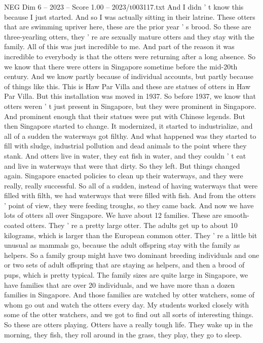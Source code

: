 \begin{textsample}{NEG Dim 6 – 2023 – Score 1.00 – 2023/t003117.txt}
And I didn ' t know this because I just started.
And so I was actually sitting in their latrine.
These otters that are swimming upriver here, these are the prior year ' s brood.
So these are three-yearling otters, they ' re are sexually mature otters and they stay with the family.
All of this was just incredible to me.
And part of the reason it was incredible to everybody is that the otters were returning after a long absence.
So we know that there were otters in Singapore sometime before the mid-20th century.
And we know partly because of individual accounts, but partly because of things like this.
This is Haw Par Villa and these are statues of otters in Haw Par Villa.
But this installation was moved in 1937.
So before 1937, we know that otters weren ' t just present in Singapore, but they were prominent in Singapore.
And prominent enough that their statues were put with Chinese legends.
But then Singapore started to change.
It modernized, it started to industrialize, and all of a sudden the waterways got filthy.
And what happened was they started to fill with sludge, industrial pollution and dead animals to the point where they stank.
And otters live in water, they eat fish in water, and they couldn ' t eat and live in waterways that were that dirty.
So they left.
But things changed again.
Singapore enacted policies to clean up their waterways, and they were really, really successful.
So all of a sudden, instead of having waterways that were filled with filth, we had waterways that were filled with fish.
And from the otters ' point of view, they were feeding troughs, so they came back.
And now we have lots of otters all over Singapore.
We have about 12 families.
These are smooth-coated otters.
They ' re a pretty large otter.
The adults get up to about 10 kilograms, which is larger than the European common otter.
They ' re a little bit unusual as mammals go, because the adult offspring stay with the family as helpers.
So a family group might have two dominant breeding individuals and one or two sets of adult offspring that are staying as helpers, and then a brood of pups, which is pretty typical.
The family sizes are quite large in Singapore, we have families that are over 20 individuals, and we have more than a dozen families in Singapore.
And those families are watched by otter watchers, some of whom go out and watch the otters every day.
My students worked closely with some of the otter watchers, and we got to find out all sorts of interesting things.
So these are otters playing.
Otters have a really tough life.
They wake up in the morning, they fish, they roll around in the grass, they play, they go to sleep.

\end{textsample}
